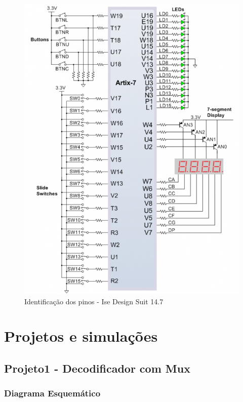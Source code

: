 \documentclass[12pts]{article}
\begin{document}
\begin{figure}[!htb]
  \centering
  \includegraphics[scale=0.3]{imagens/identificacaoPinos.png}
  \caption{Identificação dos pinos - Ise Design Suit 14.7}
  \label{figRotulo}
\end{figure}


\section{Projetos e simulações}

\iffalse	
\subsection{Projeto1 - Decodificador com Mux}
\subsubsection{Diagrama Esquemático}
\end{document}
